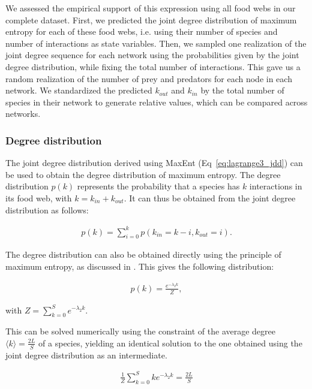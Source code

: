 We assessed the empirical support of this expression using all food webs in our
complete dataset. First, we predicted the joint degree distribution of maximum
entropy for each of these food webs, i.e. using their number of species and
number of interactions as state variables. Then, we sampled one realization of
the joint degree sequence for each network using the probabilities given by the
joint degree distribution, while fixing the total number of interactions. This
gave us a random realization of the number of prey and predators for each node
in each network. We standardized the predicted $k_{out}$ and $k_{in}$ by the
total number of species in their network to generate relative values, which can
be compared across networks.

\subsubsection{Degree distribution} 

The joint degree distribution derived using MaxEnt (Eq~\ref{eq:lagrange3_jdd})
can be used to obtain the degree distribution of maximum entropy. The degree
distribution $p(k)$ represents the probability that a species has $k$
interactions in its food web, with $k = k_{in} + k_{out}$. It can thus be
obtained from the joint degree distribution as follows: 

\begin{eqnarray}
\label{eq:dd_jdd}
       p(k) = \sum_{i=0}^k p(k_{in} = k - i, k_{out} = i).
\end{eqnarray}

The degree distribution can also be obtained directly using the principle of
maximum entropy, as discussed in \cite{Williams2011Biology}. This gives the
following distribution: 

\begin{eqnarray}
\label{eq:lagrange_dd}
       p(k) = \frac{e^{-\lambda_2k}}{Z},
\end{eqnarray}

with $Z = \sum_{k=0}^S e^{-\lambda_2k}.$

This can be solved numerically using the constraint of the average degree
$\langle k \rangle = \frac{2L}{S}$ of a species, yielding an identical solution
to the one obtained using the joint degree distribution as an intermediate. 

\begin{eqnarray}
\label{eq:lagrange2_dd}
       \frac{1}{Z}\sum_{k=0}^S k e^{-\lambda_2k} = \frac{2L}{S}
\end{eqnarray}

